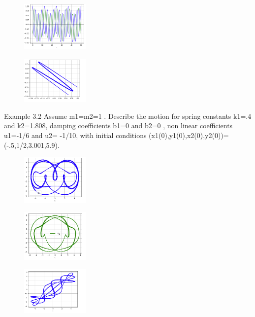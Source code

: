 \documentclass[a4paper]{article}
\begin{document}
\begin{figure}[ht!]
\centering
\includegraphics[width=0.3\textwidth]{315.png}
\end{figure}

\begin{figure}[ht!]
\centering
\includegraphics[width=0.3\textwidth]{316.png}
\end{figure}

\newpage


Example 3.2 Assume m1=m2=1 . Describe the motion for spring constants k1=.4 and k2=1.808, damping coefficients b1=0 and b2=0 , non linear coefficients u1=-1/6 and u2= -1/10,   with   initial   conditions (x1(0),y1(0),x2(0),y2(0))=(-.5,1/2,3.001,5.9).

\begin{figure}[ht!]
\centering
\includegraphics[width=0.3\textwidth]{321.png}
\end{figure}

\begin{figure}[ht!]
\centering
\includegraphics[width=0.3\textwidth]{322.png}
\end{figure}

\begin{figure}[ht!]
\centering
\includegraphics[width=0.3\textwidth]{323.png}
\end{figure}
\newpage
\end{document}
